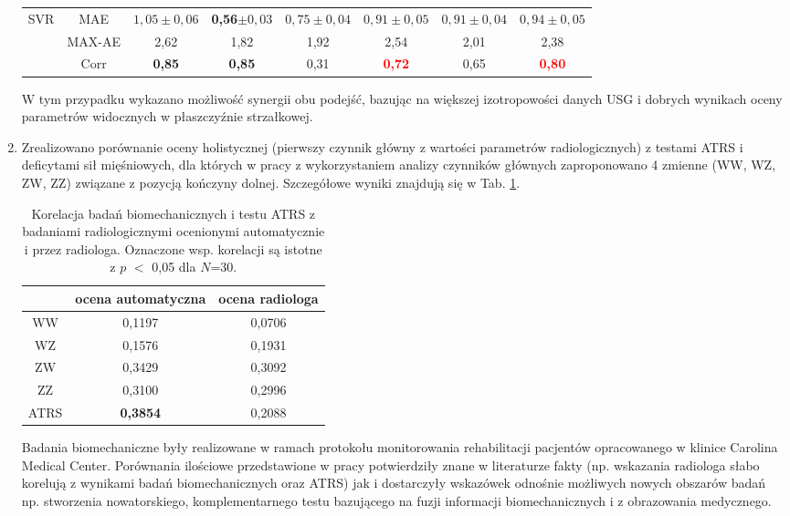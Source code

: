 \begin{enumerate}
\begin{table}[h!]
\begin{tabular}{lc||c|c|c|c|c|c}
 		SVR & MAE & $1,05\pm0,06$ & \textbf{0,56}$\pm0,03$ & $0,75\pm0,04$ & $0,91\pm0,05$ & $0,91\pm0,04$ & $0,94\pm0,05$\\
 		& MAX-AE & 2,62 & 1,82 & 1,92 & 2,54 & 2,01 & 2,38 \\
 		& Corr   & \textbf{0,85} & \textbf{0,85} & 0,31 & \textcolor{red}{\textbf{0,72}} & 0,65 & \textcolor{red}{\textbf{0,80}} \\
 		
 	\end{tabular}
 \end{table}
 \renewcommand{\arraystretch}{1}

 W tym przypadku wykazano możliwość synergii obu podejść, bazując na większej izotropowości danych USG i dobrych wynikach oceny parametrów widocznych w płaszczyźnie strzałkowej.
 \item Zrealizowano porównanie oceny holistycznej (pierwszy czynnik główny z wartości parametrów radiologicznych) z testami ATRS i deficytami sił mięśniowych, dla których w pracy z wykorzystaniem analizy czynników głównych zaproponowano 4 zmienne (WW, WZ, ZW, ZZ) związane z pozycją kończyny dolnej. Szczegółowe wyniki znajdują się w Tab. \ref{tab:bioATRSvspredGT}. 
 \vspace{0.5 cm} 
 \begin{table}[h!]
 	\centering
 	\setlength{\tabcolsep}{3pt}
 	\setlength\extrarowheight{2pt}
 	\caption{Korelacja badań biomechanicznych i testu ATRS z badaniami radiologicznymi ocenionymi automatycznie i przez radiologa. Oznaczone wsp. korelacji są istotne z $p$ $<$ 0,05 dla $N$=30.}
 	\label{tab:bioATRSvspredGT}
 	\begin{tabular}{c|c|c}
 		&ocena automatyczna&ocena radiologa \\
 		\hline \hline
 		WW&0,1197&0,0706\\
 		\hline
 		WZ&0,1576&0,1931\\
 		\hline
 		ZW&0,3429&0,3092\\
 		\hline
 		ZZ&0,3100&0,2996\\
 		\hline
 		ATRS&\textbf{0,3854}&0,2088\\
 		
 		
 	\end{tabular}
 \end{table}
	
	Badania biomechaniczne były realizowane w ramach protokołu monitorowania rehabilitacji pacjentów opracowanego w klinice Carolina Medical Center. Porównania ilościowe przedstawione w pracy potwierdziły znane w literaturze fakty (np. wskazania radiologa słabo korelują z wynikami badań biomechanicznych oraz ATRS) jak i dostarczyły wskazówek odnośnie możliwych nowych obszarów badań np. stworzenia nowatorskiego, komplementarnego testu bazującego na fuzji informacji biomechanicznych i z obrazowania medycznego. 

\end{enumerate}

